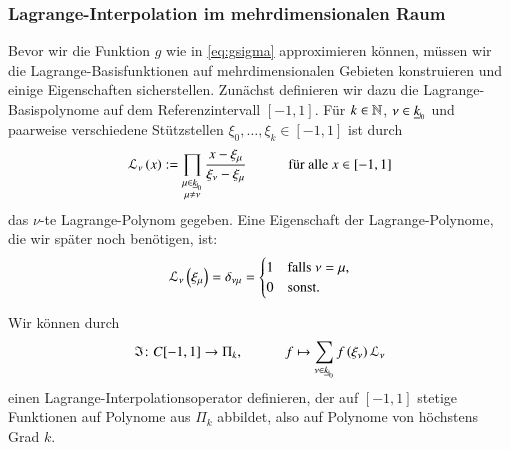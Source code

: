     \subsubsection{Lagrange-Interpolation im mehrdimensionalen Raum}
      Bevor wir die Funktion $g$ wie in \autoref{eq:gsigma} approximieren können, müssen wir die Lagrange-Basisfunktionen auf mehrdimensionalen Gebieten konstruieren und einige 
      Eigenschaften sicherstellen. 
      Zunächst definieren wir dazu die Lagrange-Basispolynome auf dem Referenzintervall $[-1,1]$. Für $k \in \mathbb{N}$, $\nu \in \nullhaken{k}$ und paarweise verschiedene Stützstellen
      $\xi_0, \dots , \xi_k \in [-1,1]$ ist durch
      \begin{equation*}
	\lag_\nu\left(x\right) := \prod_{\substack{\mu \in \nullhaken{k} \\ \mu \neq \nu}} \frac{x - \xi_\mu}{\xi_\nu - \xi_\mu} \ \ \ \ \ \ \ \ \ \ \ \  \text{für alle } x \in [-1,1]
      \end{equation*}
      das $\nu$-te Lagrange-Polynom gegeben.
      Eine Eigenschaft der Lagrange-Polynome, die wir später noch benötigen, ist:
      \begin{equation}
	\mathcal{L}_\nu\left(\xi_\mu\right) = \delta_{\nu\mu} =
	\begin{cases}
	  1 & \text{falls } \nu = \mu,\\
	  0 & \text{sonst.}
	\end{cases}
	\label{eq:lag_delta}
      \end{equation}
      
      Wir können durch
      \begin{equation*}
	\mathfrak{I} \colon C[-1,1] \to \Pi_k, \ \ \ \ \ \ \ \ \ \ \ \ f \mapsto \sum_{\nu \in \nullhaken{k}} f\left(\xi_\nu\right) \lag_\nu
      \end{equation*}
      einen Lagrange-Interpolationsoperator definieren, der auf $[-1,1]$ stetige Funktionen auf Polynome aus $\Pi_k$ abbildet, also auf Polynome von höchstens Grad $k$.
      
